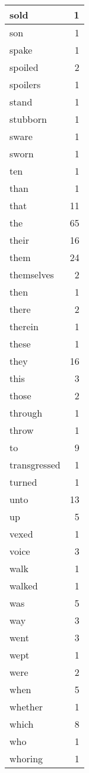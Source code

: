 \begin{center}
\begin{longtable}{l|r}
sold & 1 \\ \hline
son & 1 \\ \hline
spake & 1 \\ \hline
spoiled & 2 \\ \hline
spoilers & 1 \\ \hline
stand & 1 \\ \hline
stubborn & 1 \\ \hline
sware & 1 \\ \hline
sworn & 1 \\ \hline
ten & 1 \\ \hline
than & 1 \\ \hline
that & 11 \\ \hline
the & 65 \\ \hline
their & 16 \\ \hline
them & 24 \\ \hline
themselves & 2 \\ \hline
then & 1 \\ \hline
there & 2 \\ \hline
therein & 1 \\ \hline
these & 1 \\ \hline
they & 16 \\ \hline
this & 3 \\ \hline
those & 2 \\ \hline
through & 1 \\ \hline
throw & 1 \\ \hline
to & 9 \\ \hline
transgressed & 1 \\ \hline
turned & 1 \\ \hline
unto & 13 \\ \hline
up & 5 \\ \hline
vexed & 1 \\ \hline
voice & 3 \\ \hline
walk & 1 \\ \hline
walked & 1 \\ \hline
was & 5 \\ \hline
way & 3 \\ \hline
went & 3 \\ \hline
wept & 1 \\ \hline
were & 2 \\ \hline
when & 5 \\ \hline
whether & 1 \\ \hline
which & 8 \\ \hline
who & 1 \\ \hline
whoring & 1 \\ \hline

\end{longtable}
\end{center}
